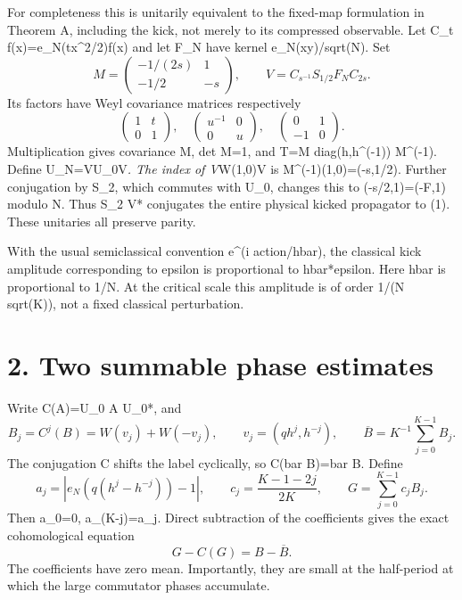\documentclass[11pt,a4paper]{article}
\begin{document}
For completeness this is unitarily equivalent to the fixed-map formulation in Theorem A, including the kick, not merely to its compressed observable. Let C\_t f(x)=e\_N(tx\^{}2/2)f(x) and let F\_N have kernel e\_N(xy)/sqrt(N). Set \[
 M=\begin{pmatrix}-1/(2s)&1\\-1/2&-s\end{pmatrix},\qquad
 V=C_{s^{-1}}S_{1/2}F_N C_{2s}.
\] Its factors have Weyl covariance matrices respectively \[
 \begin{pmatrix}1&t\\0&1\end{pmatrix},\quad
 \begin{pmatrix}u^{-1}&0\\0&u\end{pmatrix},\quad
 \begin{pmatrix}0&1\\-1&0\end{pmatrix}.
\] Multiplication gives covariance M, det M=1, and T=M diag(h,h\^{}(-1)) M\^{}(-1). Define U\_N=VU\_0V\emph{. The index of V}W(1,0)V is M\^{}(-1)(1,0)=(-s,1/2). Further conjugation by S\_2, which commutes with U\_0, changes this to (-s/2,1)=(-F,1) modulo N. Thus S\_2 V* conjugates the entire physical kicked propagator to (1). These unitaries all preserve parity.

With the usual semiclassical convention e\^{}(i action/hbar), the classical kick amplitude corresponding to epsilon is proportional to hbar*epsilon. Here hbar is proportional to 1/N. At the critical scale this amplitude is of order 1/(N sqrt(K)), not a fixed classical perturbation.

\hypertarget{two-summable-phase-estimates}{%
\section{2. Two summable phase estimates}\label{two-summable-phase-estimates}}

Write C(A)=U\_0 A U\_0*, and \[
 B_j=C^j(B)=W(v_j)+W(-v_j),\qquad v_j=(qh^j,h^{-j}),
 \qquad \overline B=K^{-1}\sum_{j=0}^{K-1}B_j.                    \tag{2}
\] The conjugation C shifts the label cyclically, so C(bar B)=bar B. Define \[
 a_j=\left|e_N(q(h^j-h^{-j}))-1\right|,\qquad
 c_j=\frac{K-1-2j}{2K},\qquad G=\sum_{j=0}^{K-1}c_jB_j.          \tag{3}
\] Then a\_0=0, a\_(K-j)=a\_j. Direct subtraction of the coefficients gives the exact cohomological equation \[
 G-C(G)=B-\overline B.                                         \tag{4}
\] The coefficients have zero mean. Importantly, they are small at the half-period at which the large commutator phases accumulate.
\end{document}
